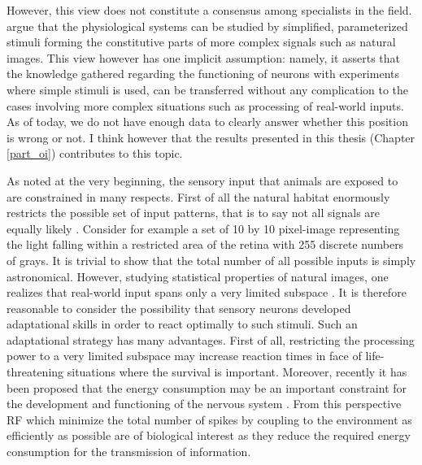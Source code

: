 However, this view does not constitute a consensus among specialists in the
field. \cite{rust2005a} argue that the physiological systems can be studied
by simplified, parameterized stimuli forming the constitutive parts of more
complex signals such as natural images. This view however has one implicit
assumption: namely, it asserts that the knowledge gathered regarding the
functioning of neurons with experiments where simple stimuli is used, can
be transferred without any complication to the cases involving more complex
situations such as processing of real-world inputs. As of today, we do not
have enough data to clearly answer whether this position is wrong or not.
I think however that the results presented in this thesis (Chapter
\ref{part_oi}) contributes to this topic. 


As noted at the very beginning, the sensory input that animals are exposed
to are constrained in many respects. First of all the natural habitat
enormously restricts the possible set of input patterns, that is to say not
all signals are equally likely \citep{simoncelli2001a, barlow1961a,
atick1992a}. Consider for example a set of 10 by 10 pixel-image
representing the light falling within a restricted area of the retina with
255 discrete numbers of grays. It is trivial to show that the total number
of all possible inputs is simply astronomical. However, studying
statistical properties of natural images, one realizes that real-world
input spans only a very limited subspace \citep{chandler2007a}. It is
therefore reasonable to consider the possibility that sensory neurons
developed adaptational skills in order to react optimally to such stimuli.
Such an adaptational strategy has many advantages. First of all,
restricting the processing power to a very limited subspace may increase
reaction times in face of life-threatening situations where the survival is
important.  Moreover, recently it has been proposed that the energy
consumption may be an important constraint for the development and
functioning of the nervous system \citep{laughlin1998a}. From this
perspective RF which minimize the total number of spikes by coupling to the
environment as efficiently as possible are of biological interest as they
reduce the required energy consumption for the transmission of information.


